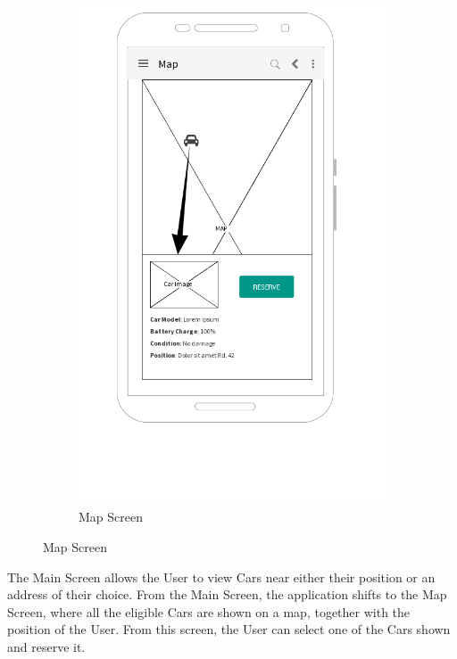 \documentclass[12pt]{article}
\begin{document}
\begin{figure}[h!]
\begin{subfigure}[b]{0.45\textwidth}
        \includegraphics[width=\textwidth]{../UI/MapScreen}
        \caption{Map Screen}
    \end{subfigure}
\end{figure}
The Main Screen allows the User to view Cars near either their position or an address of their choice. From the Main Screen, the application shifts to the Map Screen, where all the eligible Cars are shown on a map, together with the position of the User. From this screen, the User can select one of the Cars shown and reserve it.\clearpage
\end{document}
